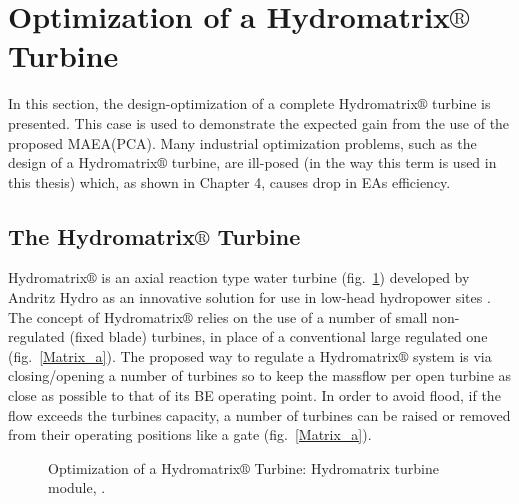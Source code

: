 \clearpage

\section{Optimization of a Hydromatrix$\circledR$ Turbine}
\label{Matrix-case}
In this section, the design-optimization of a complete Hydromatrix$\circledR$ turbine is presented. This case is used to demonstrate the expected gain from the use of the proposed MAEA(PCA). Many industrial optimization problems, such as the design of a  Hydromatrix$\circledR$ turbine, are ill-posed (in the way this term is used in this thesis) which, as shown in Chapter 4, causes drop in EAs efficiency.   
\subsection{The Hydromatrix$\circledR$ Turbine}
Hydromatrix$\circledR$ is an axial reaction type water turbine (fig.\ \ref{Matrix_c}) developed by Andritz Hydro as an innovative solution for use in low-head hydropower sites \cite{matrix,matrix_2}. The concept of Hydromatrix$\circledR$ relies on the use of a number of small non-regulated (fixed blade) turbines, in place of a conventional large regulated one (fig.\ \ref{Matrix_a}).  The proposed way to regulate a Hydromatrix$\circledR$ system is via closing/opening a number of turbines so to keep the massflow per open turbine as close as possible to that of its BE operating point. In order to avoid flood, if the flow exceeds the turbines capacity, a number of turbines can be raised or removed from their operating positions like a gate (fig.\ \ref{Matrix_a}).  


\begin{figure}[h!]
\begin{minipage}[b]{1.0\linewidth}
 \centering
\end{minipage}
\caption{Optimization of a Hydromatrix$\circledR$ Turbine:  Hydromatrix turbine module, \cite{matrix,matrix_2}. }
\label{Matrix_c}
\end{figure}

